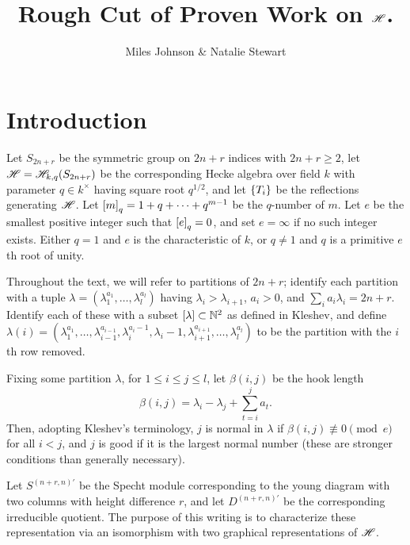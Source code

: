 \documentclass{amsart}
\begin{document}
\title{Rough Cut of Proven Work on $\mathscr{H}$.}
\author{Miles Johnson \& Natalie Stewart}
\maketitle

\section{Introduction}
Let $S_{2n+r}$ be the symmetric group on $2n+r$ indices with $2n + r \geq 2$, let $\mathscr{H} = \mathscr{H}_{k,q}(S_{2n+r})$ be the corresponding Hecke algebra over field $k$ with parameter $q \in k^\times$ having square root $q^{1/2}$, and let $\left\{ T_i \right\}$ be the reflections generating $\mathscr{H}$.
Let $\left[ m \right]_q = 1 + q + \dots + q^{m-1}$ be the $q$-number of $m$. 
Let $e$ be the smallest positive integer such that $\left[ e \right]_q = 0$, and set $e = \infty$ if no such integer exists.
Either $q = 1$ and $e$ is the characteristic of $k$, or $q \neq 1$ and $q$ is a primitive $e$th root of unity.

Throughout the text, we will refer to partitions of $2n + r$;
identify each partition with a tuple $\lambda = (\lambda_1^{a_1},\dots,\lambda_l^{a_l})$ having $\lambda_i > \lambda_{i+1}$, $a_i > 0$, and $\sum_i a_i\lambda_i = 2n + r$.
Identify each of these with a subset $\left[ \lambda \right] \subset \mathbb{N}^2$ as defined in Kleshev, and define $\lambda(i) = (\lambda_1^{a_1},\dots,\lambda_{i-1}^{a_{i-1}},\lambda_i^{a_i - 1},\lambda_i-1,\lambda_{i+1}^{a_{i+1}},\dots,\lambda_l^{a_l})$ to be the partition with the $i$th row removed.

Fixing some partition $\lambda$, for $1 \leq i \leq j \leq l$, let $\beta(i,j)$ be the hook length
\[
  \beta(i,j) = \lambda_i - \lambda_j + \sum_{t = i}^j a_t.
\]
Then, adopting Kleshev's terminology, $j$ is normal in $\lambda$ if $\beta(i,j) \not\equiv 0 \pmod e$ for all $i < j$, and $j$ is good if it is the largest normal number (these are stronger conditions than generally necessary). 

Let $S^{(n+r,n)'}$ be the Specht module corresponding to the young diagram with two columns with height difference $r$, and let $D^{(n+r,n)'}$ be the corresponding irreducible quotient.
The purpose of this writing is to characterize these representation via an isomorphism with two graphical representations of $\mathscr{H}$.
\end{document}
